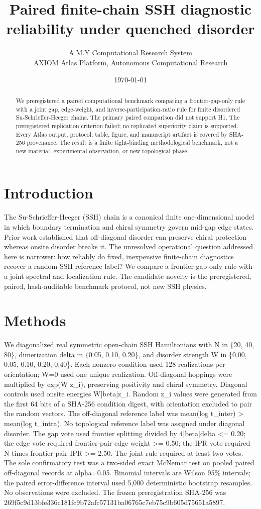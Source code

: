 \documentclass[11pt,a4paper]{article}
\title{Paired finite-chain SSH diagnostic reliability under quenched disorder}
\author{A.M.Y Computational Research System\\
\small AXIOM Atlas Platform, Autonomous Computational Research}
\date{\today}
\begin{document}
\maketitle

\begin{abstract}
We preregistered a paired computational benchmark comparing a frontier-gap-only rule with a joint gap, edge-weight, and inverse-participation-ratio rule for finite disordered Su-Schrieffer-Heeger chains. The primary paired comparison did not support H1. The preregistered replication criterion failed; no replicated superiority claim is supported. Every Atlas output, protocol, table, figure, and manuscript artifact is covered by SHA-256 provenance. The result is a finite tight-binding methodological benchmark, not a new material, experimental observation, or new topological phase.
\end{abstract}

\section{Introduction}
The Su-Schrieffer-Heeger (SSH) chain is a canonical finite one-dimensional model in which boundary termination and chiral symmetry govern mid-gap edge states. Prior work established that off-diagonal disorder can preserve chiral protection whereas onsite disorder breaks it. The unresolved operational question addressed here is narrower: how reliably do fixed, inexpensive finite-chain diagnostics recover a random-SSH reference label? We compare a frontier-gap-only rule with a joint spectral and localization rule. The candidate novelty is the preregistered, paired, hash-auditable benchmark protocol, not new SSH physics.


\section{Methods}
We diagonalized real symmetric open-chain SSH Hamiltonians with N in \{20, 40, 80\}, dimerization delta in \{0.05, 0.10, 0.20\}, and disorder strength W in \{0.00, 0.05, 0.10, 0.20, 0.40\}. Each nonzero condition used 128 realizations per orientation; W=0 used one unique realization. Off-diagonal hoppings were multiplied by exp(W z\_i), preserving positivity and chiral symmetry. Diagonal controls used onsite energies W|beta|z\_i. Random z\_i values were generated from the first 64 bits of a SHA-256 condition digest, with orientation excluded to pair the random vectors. The off-diagonal reference label was mean(log t\_inter) > mean(log t\_intra). No topological reference label was assigned under diagonal disorder. The gap vote used frontier splitting divided by 4|beta|delta <= 0.20; the edge vote required frontier-pair edge weight >= 0.50; the IPR vote required N times frontier-pair IPR >= 2.50. The joint rule required at least two votes. The sole confirmatory test was a two-sided exact McNemar test on pooled paired off-diagonal records at alpha=0.05. Binomial intervals are Wilson 95\% intervals; the paired error-difference interval used 5,000 deterministic bootstrap resamples. No observations were excluded. The frozen preregistration SHA-256 was 269f5c9d13bfe336c181fc9b72afc57131ba06765c7eb75c9b605d75651a5897.
\end{document}
